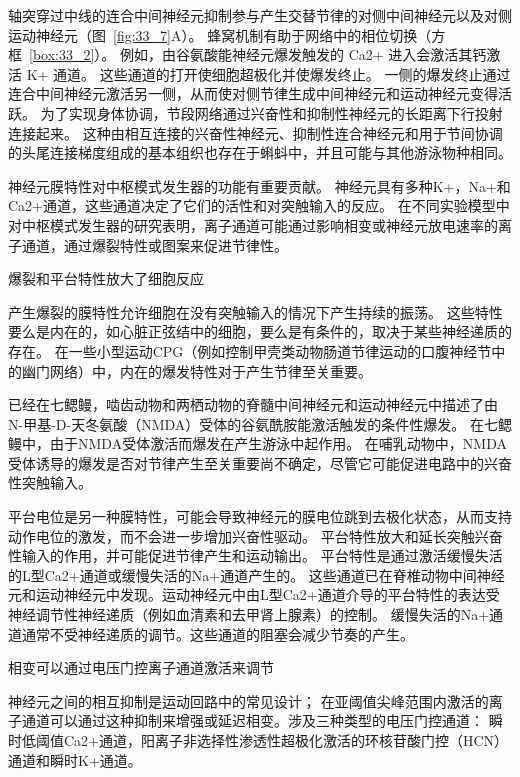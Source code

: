 轴突穿过中线的连合中间神经元抑制参与产生交替节律的对侧中间神经元以及对侧运动神经元（图~\ref{fig:33_7}A）。
蜂窝机制有助于网络中的相位切换（方框~\ref{box:33_2}）。
例如，由谷氨酸能神经元爆发触发的 Ca2+ 进入会激活其钙激活 K+ 通道。
这些通道的打开使细胞超极化并使爆发终止。
一侧的爆发终止通过连合中间神经元激活另一侧，从而使对侧节律生成中间神经元和运动神经元变得活跃。
为了实现身体协调，节段网络通过兴奋性和抑制性神经元的长距离下行投射连接起来。
这种由相互连接的兴奋性神经元、抑制性连合神经元和用于节间协调的头尾连接梯度组成的基本组织也存在于蝌蚪中，并且可能与其他游泳物种相同。


\begin{proposition}[神经元离子通道有助于中枢模式发生器功能] \label{box:33_2}
	
	\quad \quad 神经元膜特性对中枢模式发生器的功能有重要贡献。
	神经元具有多种K+，Na+和Ca2+通道，这些通道决定了它们的活性和对突触输入的反应。
	在不同实验模型中对中枢模式发生器的研究表明，离子通道可能通过影响相变或神经元放电速率的离子通道，通过爆裂特性或图案来促进节律性。
	
	\quad \quad 爆裂和平台特性放大了细胞反应
	
	\quad \quad 产生爆裂的膜特性允许细胞在没有突触输入的情况下产生持续的振荡。
	这些特性要么是内在的，如心脏正弦结中的细胞，要么是有条件的，取决于某些神经递质的存在。
	在一些小型运动CPG（例如控制甲壳类动物肠道节律运动的口腹神经节中的幽门网络）中，内在的爆发特性对于产生节律至关重要。
	
	\quad \quad 已经在七鳃鳗，啮齿动物和两栖动物的脊髓中间神经元和运动神经元中描述了由N-甲基-D-天冬氨酸（NMDA）受体的谷氨酰胺能激活触发的条件性爆发。
	在七鳃鳗中，由于NMDA受体激活而爆发在产生游泳中起作用。
	在哺乳动物中，NMDA受体诱导的爆发是否对节律产生至关重要尚不确定，尽管它可能促进电路中的兴奋性突触输入。
	
	\quad \quad 平台电位是另一种膜特性，可能会导致神经元的膜电位跳到去极化状态，从而支持动作电位的激发，而不会进一步增加兴奋性驱动。
	平台特性放大和延长突触兴奋性输入的作用，并可能促进节律产生和运动输出。
	平台特性是通过激活缓慢失活的L型Ca2+通道或缓慢失活的Na+通道产生的。
	这些通道已在脊椎动物中间神经元和运动神经元中发现。运动神经元中由L型Ca2+通道介导的平台特性的表达受神经调节性神经递质（例如血清素和去甲肾上腺素）的控制。
	缓慢失活的Na+通道通常不受神经递质的调节。这些通道的阻塞会减少节奏的产生。
	
	\quad \quad 相变可以通过电压门控离子通道激活来调节
	
	\quad \quad 神经元之间的相互抑制是运动回路中的常见设计；
	在亚阈值尖峰范围内激活的离子通道可以通过这种抑制来增强或延迟相变。涉及三种类型的电压门控通道：
	瞬时低阈值Ca2+通道，阳离子非选择性渗透性超极化激活的环核苷酸门控（HCN）通道和瞬时K+通道。
	

\end{proposition}
